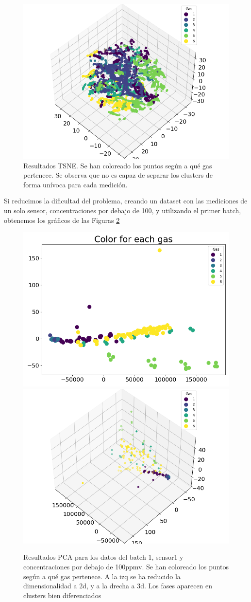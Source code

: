 \begin{figure}[h!]
	\centering
	\includegraphics[width=0.9\linewidth]{"../py_imgs/Step0_3_TSNE_3d_All data"}
	\caption[Resultados TSNE]{Resultados TSNE. Se han coloreado los  puntos según a qué gas pertenece. Se observa que no es capaz de separar los clusters de forma unívoca para cada medición.}
	\label{fig:step03tsnecolor-for-each-gas}
\end{figure}

Si reducimos la dificultad del problema, creando un dataset con las mediciones de un solo sensor, concentraciones por debajo de 100, y utilizando el primer batch, obtenemos los gráficos de las Figuras \ref{fig:step03kmeans-reduced-color-for-each-gas}

\begin{figure}[h!]
	\centering
	\includegraphics[width=0.45\linewidth]{"../py_imgs/Step0_3_Color for each gas_Batch1_Sensor1_Conc less 100ppmv"}
	\includegraphics[width=0.45\linewidth]{"../py_imgs/Step0_3_Color for each gas_3d_Batch1_Sensor1_Conc less 100ppmv"}
	\caption[Resultados PCA modelo simplificado]{Resultados PCA para los datos del batch 1, sensor1 y concentraciones por debajo de 100ppmv. Se han coloreado los  puntos según a qué gas pertenece. A la izq se ha reducido la dimensionalidad a 2d, y a la drecha a 3d. Los fases aparecen en clusters bien diferenciados}
	\label{fig:step03kmeans-reduced-color-for-each-gas}
\end{figure}

